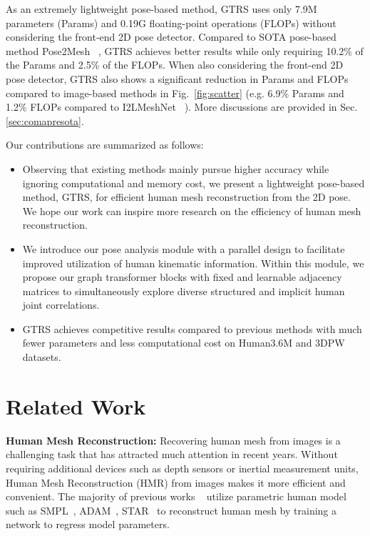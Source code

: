 \documentclass[sigconf]{acmart}
\begin{document}
As an extremely lightweight pose-based method, GTRS uses only 7.9M parameters (Params) and 0.19G floating-point operations (FLOPs) without considering the front-end 2D pose detector. Compared to SOTA pose-based method Pose2Mesh ~\cite{Choi_2020_ECCV_Pose2Mesh}, GTRS achieves better results while only requiring 10.2\% of the Params and 2.5\% of the FLOPs. When also considering the front-end 2D pose detector, GTRS also shows a significant reduction in Params and FLOPs compared to image-based methods in Fig.~\ref{fig:scatter} (e.g. 6.9\% Params and 1.2\% FLOPs compared to I2LMeshNet ~\cite{Moon_I2L_MeshNet}). 
More discussions are provided in Sec. \ref{sec:comapresota}. 

Our contributions are summarized as follows: 
\begin{itemize}[noitemsep,leftmargin=*]  

\item Observing that existing methods mainly pursue higher accuracy while ignoring computational and memory cost, we present a lightweight pose-based method, GTRS, for efficient human mesh reconstruction from the 2D pose. We hope our work can inspire more research on the efficiency of human mesh reconstruction. 

\item We introduce our pose analysis module with a parallel design to facilitate improved utilization of human kinematic information. Within this module, we propose our graph transformer blocks with fixed and learnable adjacency matrices to simultaneously explore diverse structured and implicit human joint correlations.


\item GTRS achieves competitive results compared to previous methods with much fewer parameters and less computational cost on Human3.6M and 3DPW datasets. 
\end{itemize}



\section{Related Work}
\textbf{Human Mesh Reconstruction:}
Recovering human mesh from images is a challenging task that has attracted much attention in recent years. Without requiring additional devices such as depth sensors or inertial measurement
units, Human Mesh Reconstruction (HMR) from images makes it more efficient and convenient. 
The majority of previous works ~\cite{Kolotouros2019SPIN,lin2021metro,lin2021_mesh_graphormer} utilize parametric human model such as SMPL~\cite{SMPL:2015}, ADAM~\cite{TotalCapture}, STAR~\cite{STAR2020} to reconstruct human mesh by training a network to regress model parameters. 
\end{document}
